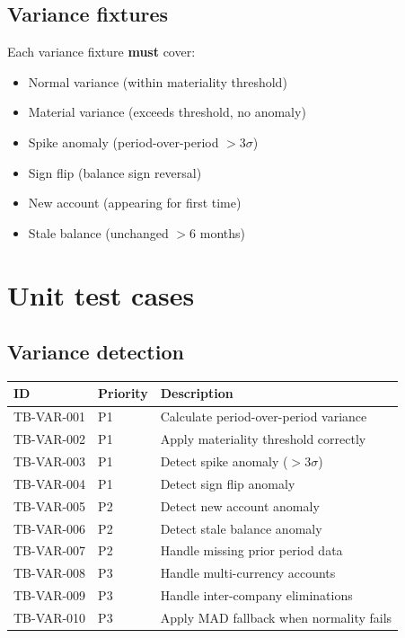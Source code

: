 \subsection{Variance fixtures}

Each variance fixture \textbf{must} cover:
\begin{itemize}
  \item Normal variance (within materiality threshold)
  \item Material variance (exceeds threshold, no anomaly)
  \item Spike anomaly (period-over-period $>3\sigma$)
  \item Sign flip (balance sign reversal)
  \item New account (appearing for first time)
  \item Stale balance (unchanged $>$6 months)
\end{itemize}

\section{Unit test cases}

\subsection{Variance detection}

\begin{tabularx}{\linewidth}{@{}l l X@{}}
\toprule
\textbf{ID} & \textbf{Priority} & \textbf{Description} \\ \midrule
TB-VAR-001 & P1 & Calculate period-over-period variance \\
TB-VAR-002 & P1 & Apply materiality threshold correctly \\
TB-VAR-003 & P1 & Detect spike anomaly ($>3\sigma$) \\
TB-VAR-004 & P1 & Detect sign flip anomaly \\
TB-VAR-005 & P2 & Detect new account anomaly \\
TB-VAR-006 & P2 & Detect stale balance anomaly \\
TB-VAR-007 & P2 & Handle missing prior period data \\
TB-VAR-008 & P3 & Handle multi-currency accounts \\
TB-VAR-009 & P3 & Handle inter-company eliminations \\
TB-VAR-010 & P3 & Apply MAD fallback when normality fails \\
\bottomrule
\end{tabularx}

